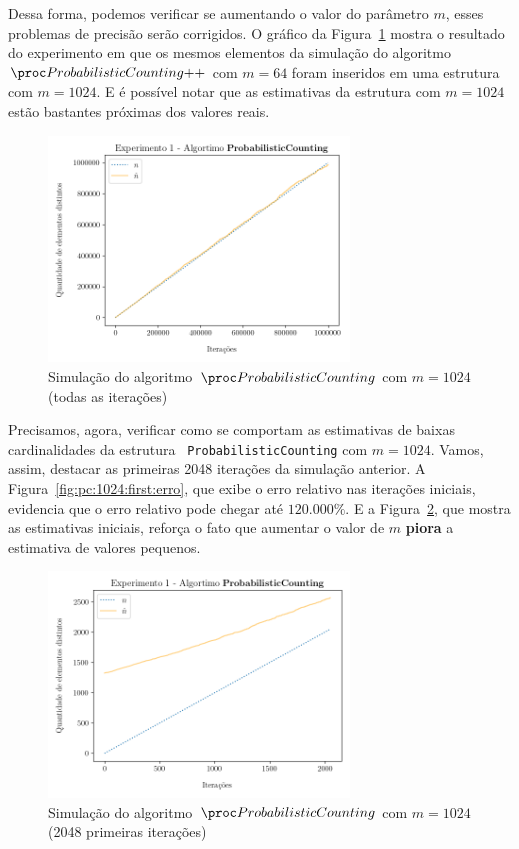 Dessa forma, podemos verificar se aumentando o valor do parâmetro $m$, esses problemas de precisão serão corrigidos. O 
gráfico da Figura~\ref{fig:pc:1024:full} mostra o resultado do experimento em que os mesmos elementos da simulação do 
algoritmo~$\pcpp$ com $m = 64$ foram inseridos em uma estrutura com $m = 1024$. E é possível notar que as estimativas da 
estrutura com $m = 1024$ estão bastantes próximas dos valores reais.

\begin{figure}[h]
  \centering
  \includegraphics[height=6cm, width=\textwidth]{figuras/probabilistic_counting_full_1024.png}
	\caption{Simulação do algoritmo~$\pc$ com $m = 1024$ (todas as iterações)}
  \label{fig:pc:1024:full}
\end{figure}

\newpage
Precisamos, agora, verificar como se comportam as estimativas de baixas cardinalidades da estrutura
~\texttt{ProbabilisticCounting} com $m = 1024$. Vamos, assim, destacar as primeiras 2048 iterações da simulação 
anterior. A Figura~\ref{fig:pc:1024:first:erro}, que exibe o erro relativo nas iterações iniciais, evidencia que o erro
relativo pode chegar até $120.000\%$. E a Figura~\ref{fig:pc:1024:first}, que mostra as estimativas iniciais, reforça o 
fato que aumentar o valor de $m$ \textbf{piora} a estimativa de valores pequenos.

\begin{figure}[h]
  \centering
  \includegraphics[height=6cm, width=\textwidth]{figuras/probabilistic_counting_first_1024.png}
	\caption{Simulação do algoritmo~$\pc$ com $m = 1024$ (2048 primeiras iterações)}
  \label{fig:pc:1024:first}
\end{figure}

